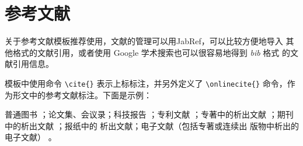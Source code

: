 
\section{参考文献}
\label{sec:bib}

关于参考文献模板推荐使用\BibTeX{}，文献的管理可以用JabRef，可以比较方便地导入
其他格式的文献引用，或者使用 Google 学术搜索也可以很容易地得到 \emph{bib} 格式
的文献引用信息。

模板中使用命令 \verb|\cite{}| 表示上标标注，并另外定义了 \verb|\onlinecite{}|
命令，作为形文中的参考文献标注。下面是示例：

普通图书
\cite{gxzzzzqlyt1993,jiangyouxu1998,tangxujun1999,zhaokaihua1995,wangang1912,zhaoyaodong1998,crawfprd1995,iflai1977,obrien1994,rood2001,angwen1988}
；论文集、会议录\cite{zglxxh1990,ROSENTHALL1963,GANZHA2000}；科技报告
\cite{dtha1990,who1970,ZHANGZHIXIANG1998,CALMS1965}；专利文献
\cite{LIUJIALIN1993,hblz2001,KOSEKI2002}；专著中的析出文献
\cite{baishunong1998,gjbzjxxflbmyjs1988,hanjiren1985,BUSECK1980,FOURNEY1971,feilisheng1981,MARTIN1996}
；期刊中的析出文献
\cite{libingmu2000,taorengji1984,yzdztbmz1978,MARAIS1992,HEWITT1984}；报纸中的
析出文献\cite{Dingwenxiang2000,Zhangtianqing2000}；电子文献（包括专著或连续出
版物中析出的电子文献）
\cite{jiangxiangdong1999,xiaoniu2001,CHRISTINE1998,METCALF1995,TURCOTTE1992,Scitor1983}
。

